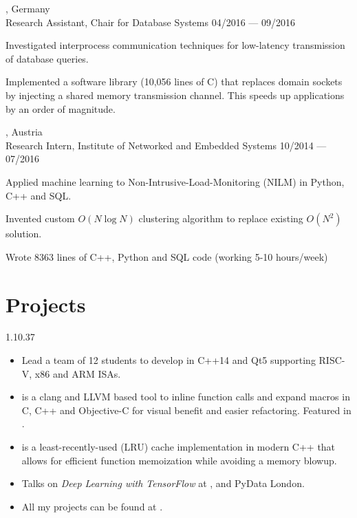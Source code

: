 \begin{entry}
  {, Germany}
	{\\Research Assistant, Chair for Database Systems}
	{04/2016 --- 09/2016}

  \item Investigated interprocess communication techniques for low-latency transmission of database queries.
  \item Implemented a software library (10,056 lines of C) that replaces domain sockets by injecting a shared memory transmission channel. This speeds up applications by an order of magnitude.
\end{entry}

\begin{entry}
  {, Austria}
	{\\Research Intern, Institute of Networked and Embedded Systems}
	{10/2014 --- 07/2016}

  \item Applied machine learning to Non-Intrusive-Load-Monitoring (NILM) in Python, C++ and SQL.
	\item Invented custom $O(N \log N)$ clustering algorithm to replace existing $O(N^2)$ solution.
	\item Wrote 8363 lines of C++, Python and SQL code (working 5-10 hours/week)
\end{entry}
\vspace{-1mm}

\section{Projects}{1.1}{0.37}
\vspace{-4mm}
\begin{itemize}
  \item Lead a team of 12 students to develop  in C++14 and Qt5 supporting RISC-V, x86 and ARM ISAs.
  \item {} is a clang and LLVM based tool to inline function calls and expand macros in C, C++ and Objective-C for visual benefit and easier refactoring. Featured in .
  \item {} is a least-recently-used (LRU) cache implementation in modern C++ that allows for efficient function memoization while avoiding a memory blowup.
  \item Talks on \emph{Deep Learning with TensorFlow} at ,  and PyData London.
  \item All my projects can be found at
	.
\end{itemize}

